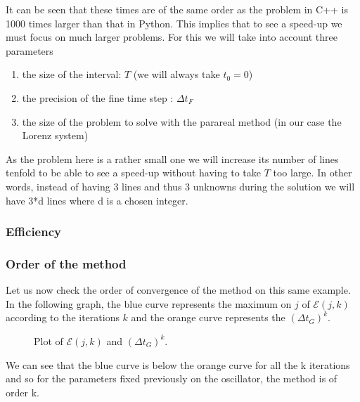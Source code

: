 \begin{enumerate}[label=\textbullet]
	It can be seen that these times are of the same order as the problem in C++ is 1000 times larger than that in Python. This implies that to see a speed-up we must focus on much larger problems. For this we will take into account three parameters
	\begin{enumerate}[label=\textbullet]
		\item the size of the interval: $T$ (we will always take $t_0=0$)
		\item the precision of the fine time step : $\Delta t_F$
		\item the size of the problem to solve with the parareal method (in our case the Lorenz system)
	\end{enumerate}
	As the problem here is a rather small one we will increase its number of lines tenfold to be able to see a speed-up without having to take $T$ too large. In other words, instead of having 3 lines and thus 3 unknowns during the solution we will have 3*d lines where d is a chosen integer.
\end{enumerate}


\subsubsection{Efficiency}

\subsubsection{Order of the method}

\noindent Let us now check the order of convergence of the method on this same example. In the following graph, the blue curve represents the maximum on $j$ of $\mathcal{E}(j,k)$ according to the iterations $k$ and the orange curve represents the $(\Delta t_G)^k$.
\begin{figure}[H]
	\centering
	\caption{Plot of $\mathcal{E}(j,k)$ and $(\Delta t_G)^k$.}
\end{figure}
\noindent We can see that the blue curve is below the orange curve for all the k iterations and so for the parameters fixed previously on the oscillator, the method is of order k.

